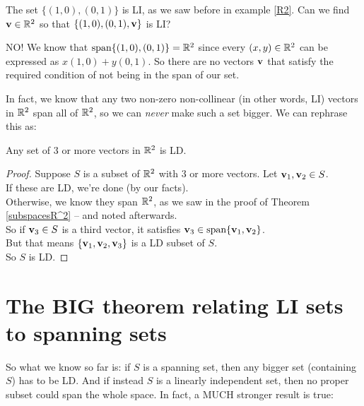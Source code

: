 \begin{myprob} The set $\{(1,0), (0,1)\}$ is LI, as we saw before in example \ref{R2}.
Can we find $\mathbf{v} \in \mathbb{R}^2$ so that $\{(1,0), (0,1), \mathbf{v}\}$ is
LI?

\begin{mysol} NO!  We know that $\textrm{span}\{ (1,0), (0,1) \} = \mathbb{R}^2$ since
every $(x,y)\in \mathbb{R}^2$ can be expressed as $x(1,0)+y(0,1)$.
So there are no vectors $\mathbf{v}$ that satisfy the required
condition of not being in the span of our set. \end{mysol}\end{myprob}

In fact, we know that any two non-zero non-collinear (in other
words, LI) vectors in $\mathbb{R}^2$ span all of $\mathbb{R}^2$, so we
can \emph{never} make such a set bigger.  We can rephrase
this as:

\begin{fac} Any set of $3$ or more vectors in $\mathbb{R}^2$ is LD.\end{fac}

\begin{proof}  Suppose $S$ is a subset of $\mathbb{R}^2$
with $3$ or more vectors.  Let $\mathbf{v}_1, \mathbf{v}_2 \in S$.\\
If these are LD, we're done (by our facts).\\
Otherwise, we know they span $\mathbb{R}^2$, as we saw in the proof of Theorem \ref{subspacesR^2} -- and noted afterwards. \\
So if $\mathbf{v}_3 \in S$ is a third vector,
it satisfies $\mathbf{v}_3 \in \textrm{span}\{\mathbf{v}_1,\mathbf{v}_2\}$.  \\
But
that means $\{\mathbf{v}_1,\mathbf{v}_2,\mathbf{v}_3\}$ is a LD subset of $S$.\\
So $S$ is LD. \end{proof}


\section{The BIG theorem relating LI sets to spanning sets}

So what we know so far is:  if $S$ is a spanning set, then 
any bigger set (containing $S$) has to be LD.  And if instead
$S$ is a linearly independent set, then no proper subset could
span the whole space.  In fact, a MUCH stronger result is true:

